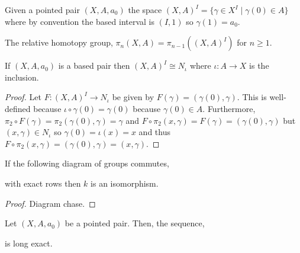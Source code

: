 \documentclass[12pt]{extarticle}
\begin{document}
\begin{definition}
Given a pointed pair $(X, A, a_0)$ the space $(X, A)^I = \{ \gamma \in X^I \mid \gamma(0) \in A \}$ where by convention the based interval is $(I, 1)$ so $\gamma(1) = a_0$. 
\end{definition}

\begin{definition}
The relative homotopy group, $\pi_n(X, A) = \pi_{n - 1}((X, A)^I)$ for $n \ge 1$. 
\end{definition}

\begin{lemma}
If $(X, A, a_0)$ is a based pair then $(X, A)^I \cong N_\iota$ where $\iota : A \to X$ is the inclusion.
\end{lemma}

\begin{proof}
Let $F : (X, A)^I \to N_\iota$ be given by $F(\gamma) = (\gamma(0), \gamma)$. This is well-defined because $\iota \circ \gamma(0) = \gamma(0)$ because $\gamma(0) \in A$. Furthermore, $\pi_2 \circ F(\gamma) = \pi_2(\gamma(0), \gamma) = \gamma$ and $F \circ \pi_2(x, \gamma) = F(\gamma) = (\gamma(0), \gamma)$ but $(x, \gamma) \in N_\iota$ so $\gamma(0) = \iota(x) = x$ and thus $F \circ \pi_2(x, \gamma) = (\gamma(0), \gamma) = (x, \gamma)$.  
\end{proof}

\begin{lemma}
If the following diagram of groups commutes,
\begin{center}
\end{center}  
with exact rows then $k$ is an isomorphism.  
\end{lemma}

\begin{proof}
Diagram chase. 
\end{proof}

\begin{proposition}
Let $(X, A, a_0)$ be a pointed pair. Then, the sequence,
\begin{center}
\end{center} 
is long exact.
\end{proposition}
\end{document}
